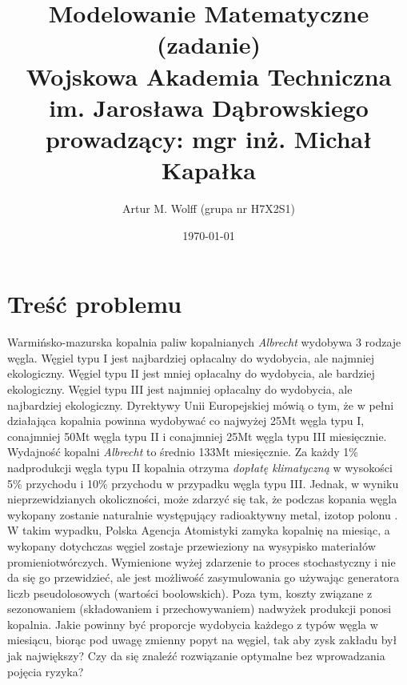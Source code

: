 \documentclass[titlepage]{article}
\title{
	\Large{Modelowanie Matematyczne (zadanie)}
	\\
	\normalsize{Wojskowa Akademia Techniczna im. Jarosława Dąbrowskiego}
	\\
	\normalsize{prowadzący: mgr inż. Michał Kapałka}
	}
\author{Artur M. Wolff (grupa nr H7X2S1)}
\date{\today}
\begin{document}
\maketitle

\section{Treść problemu}
Warmińsko-mazurska kopalnia paliw kopalnianych \textit{Albrecht} wydobywa 3 rodzaje węgla.
Węgiel typu I jest najbardziej opłacalny do wydobycia, ale najmniej ekologiczny.
Węgiel typu II jest mniej opłacalny do wydobycia, ale bardziej ekologiczny.
Węgiel typu III jest najmniej opłacalny do wydobycia, ale najbardziej ekologiczny.
Dyrektywy Unii Europejskiej mówią o tym, że w pełni działająca kopalnia powinna wydobywać co najwyżej 25Mt węgla typu I, conajmniej 50Mt węgla typu II i conajmniej 25Mt węgla typu III miesięcznie.
Wydajność kopalni \textit{Albrecht} to średnio 133Mt miesięcznie.
Za każdy 1\% nadprodukcji węgla typu II kopalnia otrzyma \textit{dopłatę klimatyczną} w wysokości 5\% przychodu i 10\% przychodu w przypadku węgla typu III.
Jednak, w wyniku nieprzewidzianych okoliczności, może zdarzyć się tak, że podczas kopania węgla wykopany zostanie naturalnie występujący radioaktywny metal, izotop polonu .
W takim wypadku, Polska Agencja Atomistyki zamyka kopalnię na miesiąc, a wykopany dotychczas węgiel zostaje przewieziony na wysypisko materiałów promieniotwórczych.
Wymienione wyżej zdarzenie to proces stochastyczny i nie da się go przewidzieć, ale jest możliwość zasymulowania go używając generatora liczb pseudolosowych (wartości boolowskich).
Poza tym, koszty związane z sezonowaniem (składowaniem i przechowywaniem) nadwyżek produkcji ponosi kopalnia.
Jakie powinny być proporcje wydobycia każdego z typów węgla w miesiącu, biorąc pod uwagę zmienny popyt na węgiel, tak aby zysk zakładu był jak największy?
Czy da się znaleźć rozwiązanie optymalne bez wprowadzania pojęcia ryzyka?
\end{document}
